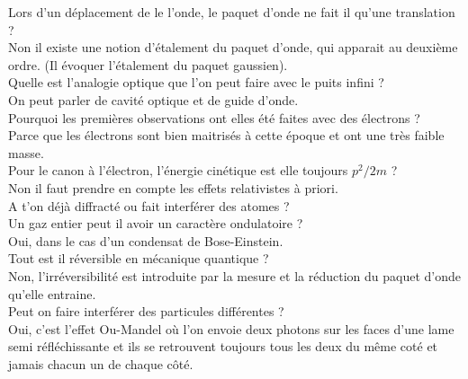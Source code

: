 \documentclass[12pt,prb,aps,epsf]{report}
\begin{document}
Lors d'un déplacement de le l'onde, le paquet d'onde ne fait il qu'une translation ?\\
Non il existe une notion d'étalement du paquet d'onde, qui apparait au deuxième ordre. (Il évoquer l'étalement du paquet gaussien).\\

Quelle est l'analogie optique que l'on peut faire avec le puits infini ?\\
On peut parler de cavité optique et de guide d'onde.\\

Pourquoi les premières observations ont elles été faites avec des électrons ?\\
Parce que les électrons sont bien maitrisés à cette époque et ont une très faible masse.\\

Pour le canon à l'électron, l'énergie cinétique est elle toujours $p^2/2m$ ?\\
Non il faut prendre en compte les effets relativistes à priori.\\

A t'on déjà diffracté ou fait interférer des atomes ?\\

Un gaz entier peut il avoir un caractère ondulatoire ?\\
Oui, dans le cas d'un condensat de Bose-Einstein.\\

Tout est il réversible en mécanique quantique ?\\
Non, l'irréversibilité est introduite par la mesure et la réduction du paquet d'onde qu'elle entraine.\\

Peut on faire interférer des particules différentes ?\\
Oui, c'est l'effet Ou-Mandel où l'on envoie deux photons sur les faces d'une lame semi réfléchissante et ils se retrouvent toujours tous les deux du même coté et jamais chacun un de chaque côté.
\end{document}
